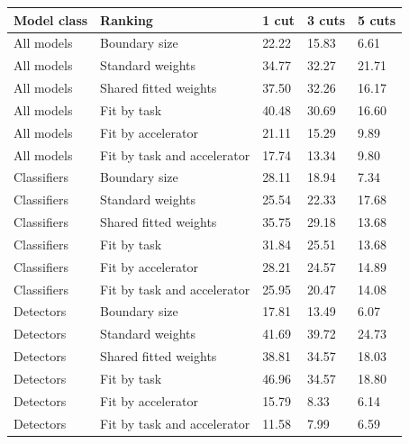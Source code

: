 \begin{tabular}{@{}lllll@{}}
\toprule
Model class & Ranking & 1 cut & 3 cuts & 5 cuts \\
\midrule
All models & Boundary size & 22.22 & 15.83 & 6.61 \\
All models & Standard weights & 34.77 & 32.27 & 21.71 \\
All models & Shared fitted weights & 37.50 & 32.26 & 16.17 \\
All models & Fit by task & 40.48 & 30.69 & 16.60 \\
All models & Fit by accelerator & 21.11 & 15.29 & 9.89 \\
All models & Fit by task and accelerator & 17.74 & 13.34 & 9.80 \\
Classifiers & Boundary size & 28.11 & 18.94 & 7.34 \\
Classifiers & Standard weights & 25.54 & 22.33 & 17.68 \\
Classifiers & Shared fitted weights & 35.75 & 29.18 & 13.68 \\
Classifiers & Fit by task & 31.84 & 25.51 & 13.68 \\
Classifiers & Fit by accelerator & 28.21 & 24.57 & 14.89 \\
Classifiers & Fit by task and accelerator & 25.95 & 20.47 & 14.08 \\
Detectors & Boundary size & 17.81 & 13.49 & 6.07 \\
Detectors & Standard weights & 41.69 & 39.72 & 24.73 \\
Detectors & Shared fitted weights & 38.81 & 34.57 & 18.03 \\
Detectors & Fit by task & 46.96 & 34.57 & 18.80 \\
Detectors & Fit by accelerator & 15.79 & 8.33 & 6.14 \\
Detectors & Fit by task and accelerator & 11.58 & 7.99 & 6.59 \\
\bottomrule
\end{tabular}
